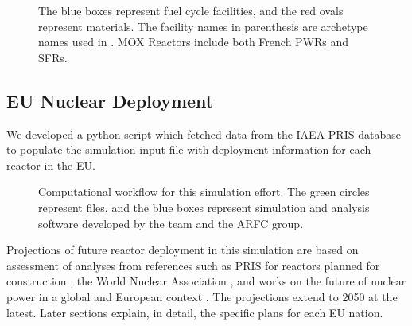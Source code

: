 \begin{figure}
{\begin{tikzpicture}[align=center, node distance = 3cm and 3cm, auto]
                \end{tikzpicture}
        
                }
                \caption{The blue boxes represent fuel cycle facilities, and the red ovals
                         represent materials. The facility names in parenthesis are archetype names
                         used in \Cyclus. \gls{MOX} Reactors include both French \glspl{PWR} and
                         \glspl{SFR}.}
                \label{fig:fc}
\end{figure}
\FloatBarrier


\subsection{\gls{EU} Nuclear Deployment}

We developed a python script which fetched data from the \gls{IAEA} \gls{PRIS} 
database \cite{iaea_nuclear_2017} to populate the \Cyclus simulation input file 
with deployment information for each reactor in the \gls{EU}.


\begin{figure}
        \centering
\caption{Computational workflow for this simulation effort. The green circles represent files, and the blue
         boxes represent simulation and analysis software developed by the 
         \Cyclus team and the \gls{ARFC} group.}
\label{fig:comp}
\end{figure}


Projections of future reactor deployment in this simulation are based on
assessment of analyses from references such as \gls{PRIS} for reactors planned
for construction \cite{iaea_nuclear_2017}, the World Nuclear Association
\cite{world_nuclear_association_nuclear_2017}, and works on the future of
nuclear power in a global \cite{joskow_future_2012} and European context
\cite{hatch_politics_2015}.  The projections extend to 2050 at the latest.  Later sections explain, in detail, the specific plans for each \gls{EU} nation.

